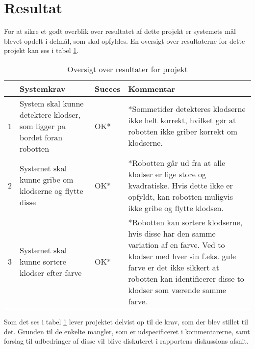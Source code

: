 \clearpage
\section{Resultat} %
\label{sec:resultat}

For at sikre et godt overblik over resultatet af dette projekt er systemets mål blevet opdelt i delmål, som skal opfyldes. En oversigt over resultaterne for dette projekt kan ses i tabel \ref{tab:resultater}.\\

\renewcommand{\arraystretch}{2}
\begin{table}[h]
	\centering
    \begin{tabular}{ | l | p{5cm} | l | p{7cm} |}
    \hline
      & Systemkrav & Succes & Kommentar \\ \hline
    1 & System skal kunne detektere klodser, som ligger på bordet foran robotten & OK* & *Sommetider detekteres klodserne ikke helt korrekt, hvilket gør at robotten ikke griber korrekt om klodserne. \\ \hline
    2 & Systemet skal kunne gribe om klodserne og flytte disse & OK* & *Robotten går ud fra at alle klodser er lige store og kvadratiske. Hvis dette ikke er opfyldt, kan robotten muligvis ikke gribe og flytte klodsen. \\ \hline
    3 & Systemet skal kunne sortere klodser efter farve & OK* & *Robotten kan sortere klodserne, hvis disse har den samme variation af en farve. Ved to klodser med hver sin f.eks. gule farve er det ikke sikkert at robotten kan identificerer disse to klodser som værende samme farve. \\ \hline
    \end{tabular}
    \caption{Oversigt over resultater for projekt}
    \label{tab:resultater}
\end{table}

Som det ses i tabel \ref{tab:resultater} lever projektet delvist op til de krav, som der blev stillet til det. Grunden til de enkelte mangler, som er udspecificeret i kommentarerne, samt forslag til udbedringer af disse vil blive diskuteret i rapportens diskussions afsnit.

